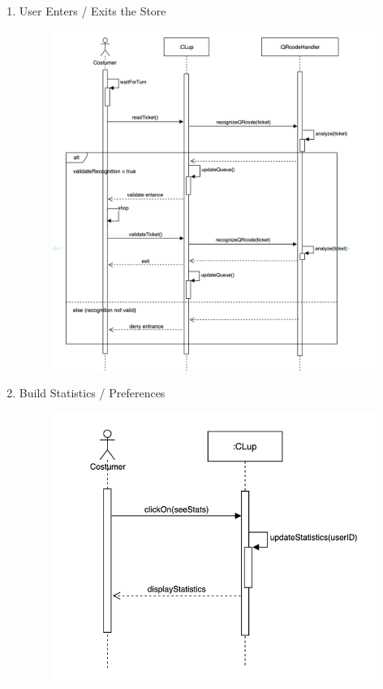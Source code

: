 \documentclass[]{article}
\begin{document}
\begin{enumerate}
						\newpage
						\item User Enters / Exits the Store
						\bigskip\bigskip
							\begin{figure}[H]
								\centering
								\includegraphics[scale=0.9]{enterexit.png}
								\caption{}
								\label{fig:enterexit_sequencediagram}
							\end{figure}

						\newpage	
						\item Build Statistics / Preferences
							\begin{figure}[H]
								\centering
								\includegraphics[scale=0.8]{buildStats.png}
								\caption{}
								\label{fig:buildstats_sequencediagram}
							\end{figure}
						

\end{enumerate}
\end{document}
